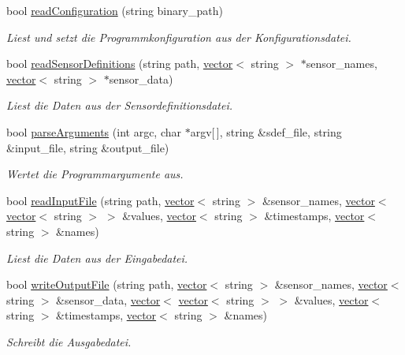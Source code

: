 \begin{DoxyCompactItemize}
bool \hyperlink{classCsvToSdConverter_a6cfc076fd11f10d70767750a6aaf1f7c}{read\-Configuration} (string binary\-\_\-path)
\begin{DoxyCompactList}\small\item\em Liest und setzt die Programmkonfiguration aus der Konfigurationsdatei. \end{DoxyCompactList}\item 
bool \hyperlink{classCsvToSdConverter_aec2430ade6f76783c958d0b8466444c4}{read\-Sensor\-Definitions} (string path, \hyperlink{classstd_1_1vector}{vector}$<$ string $>$ $\ast$sensor\-\_\-names, \hyperlink{classstd_1_1vector}{vector}$<$ string $>$ $\ast$sensor\-\_\-data)
\begin{DoxyCompactList}\small\item\em Liest die Daten aus der Sensordefinitionsdatei. \end{DoxyCompactList}\item 
bool \hyperlink{classCsvToSdConverter_adae10f022f4f05195c2a4b0a620d4645}{parse\-Arguments} (int argc, char $\ast$argv\mbox{[}$\,$\mbox{]}, string \&sdef\-\_\-file, string \&input\-\_\-file, string \&output\-\_\-file)
\begin{DoxyCompactList}\small\item\em Wertet die Programmargumente aus. \end{DoxyCompactList}\item 
bool \hyperlink{classCsvToSdConverter_ae6a8febba248592df4a0d0588018b67c}{read\-Input\-File} (string path, \hyperlink{classstd_1_1vector}{vector}$<$ string $>$ \&sensor\-\_\-names, \hyperlink{classstd_1_1vector}{vector}$<$ \hyperlink{classstd_1_1vector}{vector}$<$ string $>$ $>$ \&values, \hyperlink{classstd_1_1vector}{vector}$<$ string $>$ \&timestamps, \hyperlink{classstd_1_1vector}{vector}$<$ string $>$ \&names)
\begin{DoxyCompactList}\small\item\em Liest die Daten aus der Eingabedatei. \end{DoxyCompactList}\item 
bool \hyperlink{classCsvToSdConverter_a5a1749027e2c4dbe00feecc55b823226}{write\-Output\-File} (string path, \hyperlink{classstd_1_1vector}{vector}$<$ string $>$ \&sensor\-\_\-names, \hyperlink{classstd_1_1vector}{vector}$<$ string $>$ \&sensor\-\_\-data, \hyperlink{classstd_1_1vector}{vector}$<$ \hyperlink{classstd_1_1vector}{vector}$<$ string $>$ $>$ \&values, \hyperlink{classstd_1_1vector}{vector}$<$ string $>$ \&timestamps, \hyperlink{classstd_1_1vector}{vector}$<$ string $>$ \&names)
\begin{DoxyCompactList}\small\item\em Schreibt die Ausgabedatei. \end{DoxyCompactList}\end{DoxyCompactItemize}

